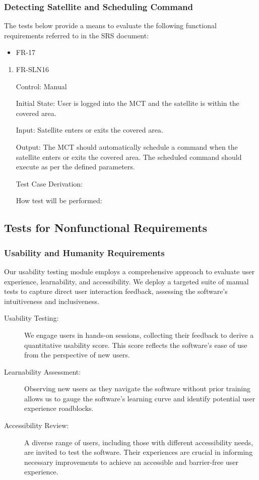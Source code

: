 \documentclass[12pt, titlepage]{article}
\begin{document}
\subsubsection{Detecting Satellite and Scheduling Command}

The tests below provide a means to evaluate the following functional requirements referred to in the SRS document:
\begin{itemize}
    \item FR-17
\end{itemize}

\begin{enumerate}

\item{FR-SLN16\\}

Control: Manual
					
Initial State: User is logged into the MCT and the satellite is within the covered area.
	
Input: Satellite enters or exits the covered area.
					
Output: The MCT should automatically schedule a command when the satellite enters or exits the covered area. The scheduled command should execute as per the defined parameters.

Test Case Derivation:
					
How test will be performed:

\end{enumerate}

\subsection{Tests for Nonfunctional Requirements}
\label{Section 4.2}


\subsubsection{Usability and Humanity Requirements}

Our usability testing module employs a comprehensive approach to evaluate user experience, learnability, and accessibility. We deploy a targeted suite of manual tests to capture direct user interaction feedback, assessing the software's intuitiveness and inclusiveness.

\begin{description}
    \item[Usability Testing:] We engage users in hands-on sessions, collecting their feedback to derive a quantitative usability score. This score reflects the software’s ease of use from the perspective of new users.
    \item[Learnability Assessment:] Observing new users as they navigate the software without prior training allows us to gauge the software's learning curve and identify potential user experience roadblocks.
    \item[Accessibility Review:] A diverse range of users, including those with different accessibility needs, are invited to test the software. Their experiences are crucial in informing necessary improvements to achieve an accessible and barrier-free user experience.
\end{description}
\end{document}
